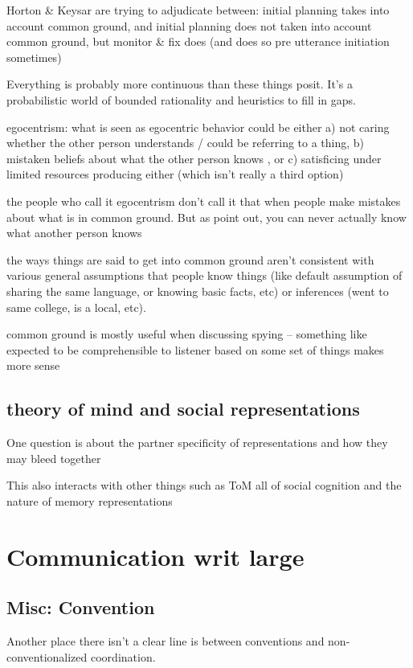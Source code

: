 \documentclass[]{article}
\begin{document}
Horton \& Keysar are trying to adjudicate between: initial planning takes into account common ground, and initial planning does not taken into account common ground, but monitor \& fix does (and does so pre utterance initiation sometimes) 

Everything is probably more continuous than these things posit. It's a probabilistic world of bounded rationality and heuristics to fill in gaps. 

egocentrism: what is seen as egocentric behavior could be either a) not caring whether the other person understands / could be referring to a thing, b) mistaken beliefs about what the other person knows , or c) satisficing under limited resources producing either (which isn't really a third option) 

the people who call it egocentrism don't call it that when people make mistakes about what is in common ground. But as \cite{hanna2003} point out, you can never actually know what another person knows 

the ways things are said to get into common ground aren't consistent with various general assumptions that people know things (like default assumption of sharing the same language, or knowing basic facts, etc) or inferences (went to same college, is a local, etc). 

common ground is mostly useful when discussing spying -- something like expected to be comprehensible to listener based on some set of things makes more sense 

\subsection{theory of mind and social representations}
One question is about the partner specificity of representations and how they may bleed together

This also interacts with other things such as ToM all of social cognition and the nature of memory representations 


\section{Communication writ large}
\subsection{Misc: Convention}

Another place there isn't a clear line is between conventions and non-conventionalized coordination. 
\end{document}

